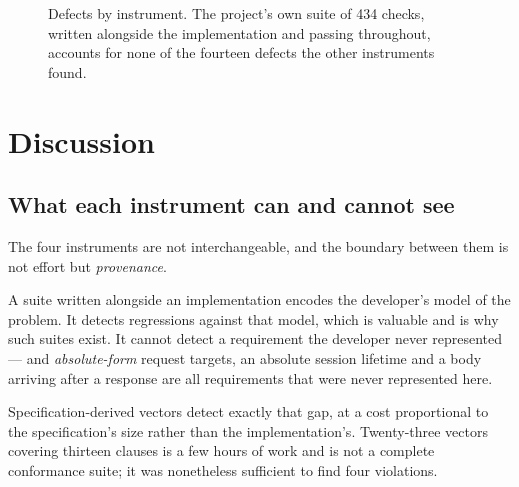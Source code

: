\documentclass[preprint,12pt]{elsarticle}
\begin{document}
\begin{figure}[ht]
\centering
{}
\caption{Defects by instrument. The project's own suite of 434 checks, written
         alongside the implementation and passing throughout, accounts for none
         of the fourteen defects the other instruments found.}
\label{fig:instrumentos}
\end{figure}

\section{Discussion}
\label{sec:discussion}

\subsection{What each instrument can and cannot see}

The four instruments are not interchangeable, and the boundary between them is
not effort but \emph{provenance}.

A suite written alongside an implementation encodes the developer's model of the
problem. It detects regressions against that model, which is valuable and is
why such suites exist. It cannot detect a requirement the developer never
represented --- and \emph{absolute-form} request targets, an absolute session
lifetime and a body arriving after a response are all requirements that were
never represented here.

Specification-derived vectors detect exactly that gap, at a cost proportional to
the specification's size rather than the implementation's. Twenty-three vectors
covering thirteen clauses is a few hours of work and is not a complete
conformance suite; it was nonetheless sufficient to find four violations.
\end{document}

